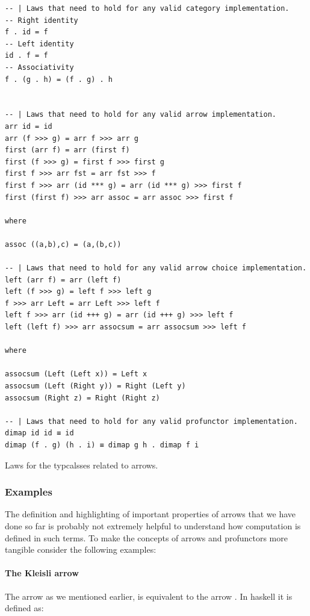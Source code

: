 \begin{code}
\begin{verbatim}
-- | Laws that need to hold for any valid category implementation.
-- Right identity
f . id = f
-- Left identity
id . f = f
-- Associativity
f . (g . h) = (f . g) . h


-- | Laws that need to hold for any valid arrow implementation.
arr id = id
arr (f >>> g) = arr f >>> arr g
first (arr f) = arr (first f)
first (f >>> g) = first f >>> first g
first f >>> arr fst = arr fst >>> f
first f >>> arr (id *** g) = arr (id *** g) >>> first f
first (first f) >>> arr assoc = arr assoc >>> first f

where

assoc ((a,b),c) = (a,(b,c))

-- | Laws that need to hold for any valid arrow choice implementation.
left (arr f) = arr (left f)
left (f >>> g) = left f >>> left g
f >>> arr Left = arr Left >>> left f
left f >>> arr (id +++ g) = arr (id +++ g) >>> left f
left (left f) >>> arr assocsum = arr assocsum >>> left f

where

assocsum (Left (Left x)) = Left x
assocsum (Left (Right y)) = Right (Left y)
assocsum (Right z) = Right (Right z)

-- | Laws that need to hold for any valid profunctor implementation.
dimap id id ≡ id
dimap (f . g) (h . i) ≡ dimap g h . dimap f i
\end{verbatim}
  \caption{\label{lst:arrow_laws}Laws for the typcalsses related to
    arrows.}
\end{code}

\subsubsection{Examples}
The definition and highlighting of important properties of arrows that
we have done so far is probably not extremely helpful to understand
how computation is defined in such terms. To make the concepts of
arrows and profunctors more tangible consider the following examples:

\paragraph{The Kleisli arrow}

The  arrow \cite{dawsonCompoundMonadsKleisli2007} as we
mentioned earlier, is equivalent to the arrow . In haskell it is defined as:


